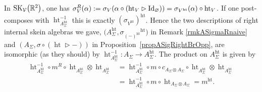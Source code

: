 \documentclass[pdftex]{sigma}%
\numberwithin{equation}{section}
\newcommand{\halft}{{\operatorname{ht}}}
\begin{document}
\begin{Remark}\label{rmkLinkTwoAsigmaR}
In ${\rm SK}_\mathcal{V}\big(\mathbb{R}^2\big)$, one has $\sigma^R_V(\alpha) := \sigma_V(\alpha \circ (\halft_V \rhd {\rm Id}_\varnothing)) = \sigma_{V^\halft}(\alpha) \circ \halft_V$. If one post-composes with $\halft_{A_\Sigma^\halft}^{-1}$ this is exactly $(\sigma_{V^\halft})^\halft$. Hence the two descriptions of right internal skein algebras we gave, $\big(A_\Sigma^\halft,{\sigma_{(-)^\halft}}^\halft\big)$ in Remark \ref{rmkASigmaRnaive} and $(A_\Sigma,\sigma \circ (\halft\rhd-))$ in Proposition~\ref{propASigRightBrOpp}, are isomorphic (as they should) by $\halft_{A_\Sigma^\halft}^{-1} \colon A_\Sigma \to A_\Sigma^\halft$. The product on $A_\Sigma^\halft$ is given by
\begin{align*}
\halft_{A_\Sigma^\halft}^{-1} \circ m^R \circ \halft_{A_\Sigma^\halft} \otimes \halft_{A_\Sigma^\halft} & = \halft_{A_\Sigma^\halft}^{-1} \circ m \circ c_{A_\Sigma \otimes A_\Sigma} \circ \halft_{A_\Sigma^\halft} \otimes \halft_{A_\Sigma^\halft} \\
& = \halft_{A_\Sigma^\halft}^{-1} \circ m \circ \halft_{A_\Sigma \otimes A_\Sigma} = m^\halft.
\end{align*}
\end{Remark}
\end{document}
